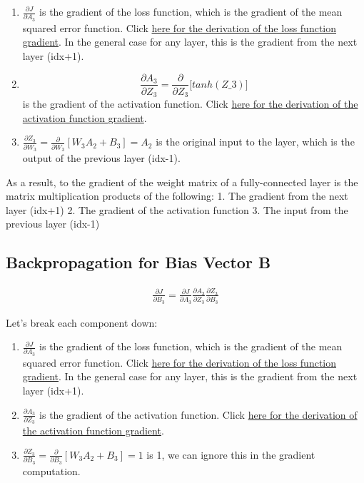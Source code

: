 \documentclass[openany]{book}
\begin{document}
\begin{enumerate}
\def\labelenumi{\arabic{enumi}.}
\item
  \(\frac{\partial J}{\partial A_3}\) is the gradient of the loss
  function, which is the gradient of the mean squared error function.
  Click
  \hyperref[mean-squared-error-gradient]{here for the derivation of the loss function gradient}.
  In the general case for any layer, this is the gradient from the next
  layer (idx+1).
\item
  \[\frac{\partial A_3}{\partial Z_3} =
  \frac{\partial}{\partial Z_3}{[}tanh(Z\_3){]} \] is the gradient of
  the activation function. Click
  \hyperref[tanh-activation-function-gradient]{here for the derivation of the activation function gradient}.
\item
  \(\frac{\partial Z_3}{\partial W_3} = \frac{\partial}{\partial W_3}[W_3 A_2 + B_3] = A_2\)
  is the original input to the layer, which is the output of the
  previous layer (idx-1).
\end{enumerate}

As a result, to the gradient of the weight matrix of a fully-connected
layer is the matrix multiplication products of the following: 1. The
gradient from the next layer (idx+1) 2. The gradient of the activation
function 3. The input from the previous layer (idx-1)

    \subsection{Backpropagation for Bias Vector
B}\label{backpropagation-for-bias-vector-b}

\begin{align*}
\frac{\partial J}{\partial B_3} = \frac{\partial J}{\partial A_3} \frac{\partial A_3}{\partial Z_3} \frac{\partial Z_3}{\partial B_3}
\end{align*}

Let's break each component down:

\begin{enumerate}
\def\labelenumi{\arabic{enumi}.}
\item
  \(\frac{\partial J}{\partial A_3}\) is the gradient of the loss
  function, which is the gradient of the mean squared error function.
  Click
  \hyperref[mean-squared-error-gradient]{here for the derivation of the loss function gradient}.
  In the general case for any layer, this is the gradient from the next
  layer (idx+1).
\item
  \(\frac{\partial A_3}{\partial Z_3}\) is the gradient of the
  activation function. Click
  \hyperref[tanh-activation-function-gradient]{here for the derivation of the activation function gradient}.
\item
  \(\frac{\partial Z_3}{\partial B_3} = \frac{\partial}{\partial B_3}[W_3 A_2 + B_3] = 1\)
  is 1, we can ignore this in the gradient computation.
\end{enumerate}
\end{document}
